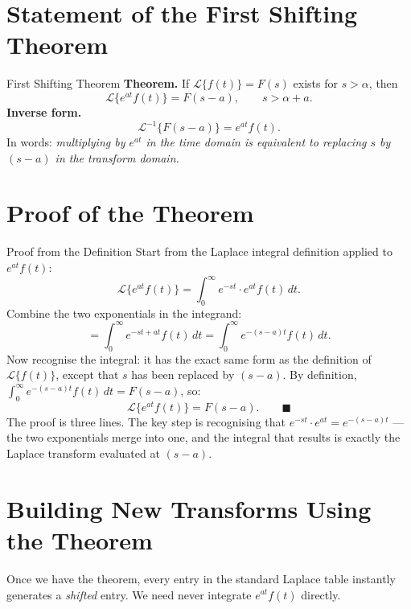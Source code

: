 \documentclass[12pt,a4paper]{article}
\begin{document}
\section{Statement of the First Shifting Theorem}

\begin{infobox}{First Shifting Theorem}
\textbf{Theorem.}
If $\mathcal{L}\{f(t)\} = F(s)$ exists for $s > \alpha$, then
\[
  \mathcal{L}\{e^{at}f(t)\} = F(s-a), \qquad s > \alpha + a.
\]
\textbf{Inverse form.}
\[
  \mathcal{L}^{-1}\{F(s-a)\} = e^{at}f(t).
\]
In words: \emph{multiplying by $e^{at}$ in the time domain is equivalent to replacing $s$ by $(s-a)$
in the transform domain.}
\end{infobox}

\section{Proof of the Theorem}

\begin{infobox}{Proof from the Definition}
Start from the Laplace integral definition applied to $e^{at}f(t)$:
\[
  \mathcal{L}\{e^{at}f(t)\}
  = \int_0^\infty e^{-st} \cdot e^{at} f(t)\,dt.
\]
Combine the two exponentials in the integrand:
\[
  = \int_0^\infty e^{-st + at} f(t)\,dt
  = \int_0^\infty e^{-(s-a)t} f(t)\,dt.
\]
Now recognise the integral: it has the exact same form as the definition of $\mathcal{L}\{f(t)\}$,
except that $s$ has been replaced by $(s-a)$.
By definition, $\int_0^\infty e^{-(s-a)t}f(t)\,dt = F(s-a)$, so:
\[
  \mathcal{L}\{e^{at}f(t)\} = F(s-a). \qquad \blacksquare
\]
The proof is three lines.
The key step is recognising that $e^{-st}\cdot e^{at} = e^{-(s-a)t}$ --- the two exponentials
merge into one, and the integral that results is exactly the Laplace transform evaluated at $(s-a)$.
\end{infobox}

\section{Building New Transforms Using the Theorem}

Once we have the theorem, every entry in the standard Laplace table instantly generates a
\emph{shifted} entry.
We need never integrate $e^{at}f(t)$ directly.
\end{document}
